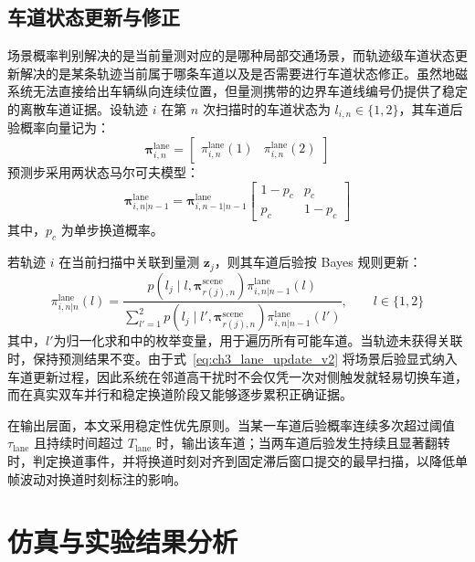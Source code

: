 \documentclass{xdupgthesis}
\begin{document}
\subsection{车道状态更新与修正}

场景概率判别解决的是当前量测对应的是哪种局部交通场景，而轨迹级车道状态更新解决的是某条轨迹当前属于哪条车道以及是否需要进行车道状态修正。虽然地磁系统无法直接给出车辆纵向连续位置，但量测携带的边界车道线编号仍提供了稳定的离散车道证据。设轨迹 $i$ 在第 $n$ 次扫描时的车道状态为 $l_{i,n}\in\{1,2\}$，其车道后验概率向量记为：
\begin{equation}
	\boldsymbol\pi_{i,n}^{\mathrm{lane}}=
	\begin{bmatrix}
		\pi_{i,n}^{\mathrm{lane}}(1) &
		\pi_{i,n}^{\mathrm{lane}}(2)
	\end{bmatrix}
	\label{eq:ch3_lane_vector_v2}
\end{equation}
预测步采用两状态马尔可夫模型：
\begin{equation}
	\boldsymbol\pi_{i,n|n-1}^{\mathrm{lane}}
	=
	\boldsymbol\pi_{i,n-1|n-1}^{\mathrm{lane}}
	\begin{bmatrix}
		1-p_c & p_c\\
		p_c & 1-p_c
	\end{bmatrix}
	\label{eq:ch3_lane_predict_v2}
\end{equation}
其中，$p_c$ 为单步换道概率。

若轨迹 $i$ 在当前扫描中关联到量测 $\mathbf z_j$，则其车道后验按 Bayes 规则更新：
\begin{equation}
	\pi_{i,n|n}^{\mathrm{lane}}(l)
	=
	\frac{p(l_j\mid l,\boldsymbol\pi_{r(j),n}^{\mathrm{scene}})\pi_{i,n|n-1}^{\mathrm{lane}}(l)}{\sum\limits_{l'=1}^{2}p(l_j\mid l',\boldsymbol\pi_{r(j),n}^{\mathrm{scene}})\pi_{i,n|n-1}^{\mathrm{lane}}(l')},
	\qquad l\in\{1,2\}
	\label{eq:ch3_lane_update_v2}
\end{equation}
其中，$l'$为归一化求和中的枚举变量，用于遍历所有可能车道。当轨迹未获得关联时，保持预测结果不变。由于式~\eqref{eq:ch3_lane_update_v2} 将场景后验显式纳入车道更新过程，因此系统在邻道高干扰时不会仅凭一次对侧触发就轻易切换车道，而在真实双车并行和稳定换道阶段又能够逐步累积正确证据。

在输出层面，本文采用稳定性优先原则。当某一车道后验概率连续多次超过阈值 $\tau_{\mathrm{lane}}$ 且持续时间超过 $T_{\mathrm{lane}}$ 时，输出该车道；当两车道后验发生持续且显著翻转时，判定换道事件，并将换道时刻对齐到固定滞后窗口提交的最早扫描，以降低单帧波动对换道时刻标注的影响。


\section{仿真与实验结果分析}
\label{sec:ch3_experiment}
\end{document}
